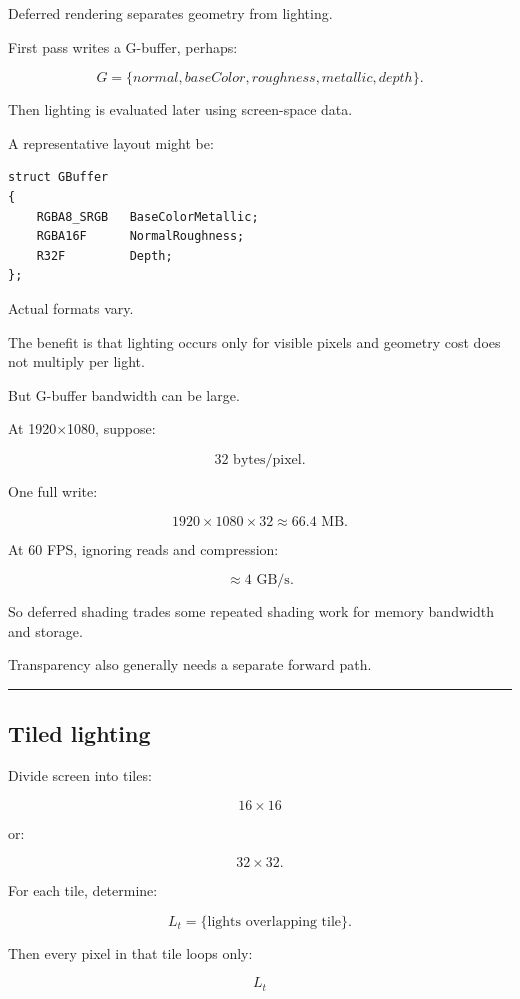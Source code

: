 Deferred rendering separates geometry from lighting.

First pass writes a G-buffer, perhaps:

\[
G=
\{
normal,
baseColor,
roughness,
metallic,
depth
\}.
\]

Then lighting is evaluated later using screen-space data.

A representative layout might be:

\begin{verbatim}
struct GBuffer
{
    RGBA8_SRGB   BaseColorMetallic;
    RGBA16F      NormalRoughness;
    R32F         Depth;
};
\end{verbatim}

Actual formats vary.

The benefit is that lighting occurs only for visible pixels and geometry cost does not multiply per light.

But G-buffer bandwidth can be large.

At 1920×1080, suppose:

\[
32\text{ bytes/pixel}.
\]

One full write:

\[
1920\times1080\times32
\approx66.4\text{ MB}.
\]

At 60 FPS, ignoring reads and compression:

\[
\approx4\text{ GB/s}.
\]

So deferred shading trades some repeated shading work for memory bandwidth and storage.

Transparency also generally needs a separate forward path.

\begin{center}\rule{0.5\linewidth}{0.5pt}\end{center}

\subsection{Tiled lighting}\label{04-visual-computing-ii-ch040-tiled-lighting}

Divide screen into tiles:

\[
16\times16
\]

or:

\[
32\times32.
\]

For each tile, determine:

\[
L_t=
\{\text{lights overlapping tile}\}.
\]

Then every pixel in that tile loops only:

\[
L_t
\]

